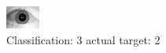 \begin{figure}[h!]
\begin{center}
\includegraphics[width=0.60\columnwidth]{figures/ID1702_class_3_target_2.png}
\end{center}
\caption{ Classification: 3 actual target: 2}
\label{fig:ID1702_class_3_target_2}
\end{figure}
